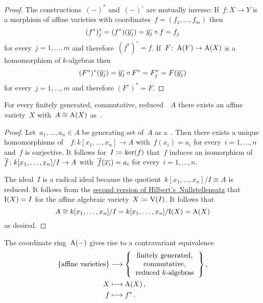 \begin{proof}
  The constructions~$(-)^*$ and~$(-)^\circ$ are mutually inverse:
  If~$f \colon X \to Y$ is a morphism of affine varieties with coordinates~$f = (f_1, \dotsc, f_m)$ then
  \[
      (f^*)^\circ_j
    = (f^*)(\overline{y_j})
    = \overline{y_j} \circ f
    = f_j
  \]
  for every~$j = 1, \dotsc, m$ and therefore~$(f^*)^\circ = f$.
  If~$F \colon \operatorname{A}(Y) \to \operatorname{A}(X)$ is a homomorphism of $k$-algebras then
  \[
      (F^\circ)^*(\overline{y_j})
    = \overline{y_j} \circ F^\circ
    = F^\circ_j
    = F(\overline{y_j})
  \]
  for every~$j = 1, \dotsc, m$ and therefore $(F^\circ)^* = F$.
\end{proof}


\begin{lemma}
  \label{coordinate ring is dense}
  For every finitely generated, commutative, reduced~~$A$ there exists an affine variety~$X$ with~$A \cong \operatorname{A}(X)$ as~.
\end{lemma}


\begin{proof}
  Let~$a_1, \dotsc, a_n \in A$ be generating set of~$A$ as a~.
  Then there exists a unique homomorphisms of~~$f \colon k[x_1, \dotsc, x_n] \to A$ with~$f(x_i) = a_i$ for every~$i = 1, \dotsc, n$ and~$f$ is surjective.
  It follows for~$I \coloneqq \ker(f)$ that~$f$ induces an isomorphism of~~$\overline{f} \colon k[x_1, \dotsc, x_n]/I \to A$ with~$\overline{f}(\overline{x_i}) = a_i$ for every~$i = 1, \dotsc, n$.
  
  The ideal~$I$ is a radical ideal because the quotient~$k[x_1, \dotsc, x_n]/I \cong A$ is reduced.
  It follows from the \hyperref[hilberts nullstellensatz correspondence]{second version of Hilbert’s~Nullstellensatz} that~$\operatorname{I}(X) = I$ for the affine algebraic variety~$X \coloneqq \operatorname{V}(I)$.
  It follows that
  \[
          A
    \cong k[x_1, \dots, x_n]/I
    =     k[x_1, \dots, x_n]/{\operatorname{I}(X)}
    =     \operatorname{A}(X)
  \]
  as desired.
\end{proof}


\begin{corollary}
  The coordinate ring~$\operatorname{A}(-)$ gives rise to a contravariant equivalence
  \begin{align*}
    \{
      \text{affine varieties}
    \}
    &\longto
    \left\{
      \begin{tabular}{c}
        finitely generated, \\
        commutative,        \\
        reduced~\dash{$k$}{algebras}
      \end{tabular}
    \right\} ,
    \\
    X
    &\longmapsto
    \coord(X) \,,
    \\
    f
    &\longmapsto
    f^* \,.
  \end{align*}
\end{corollary}


